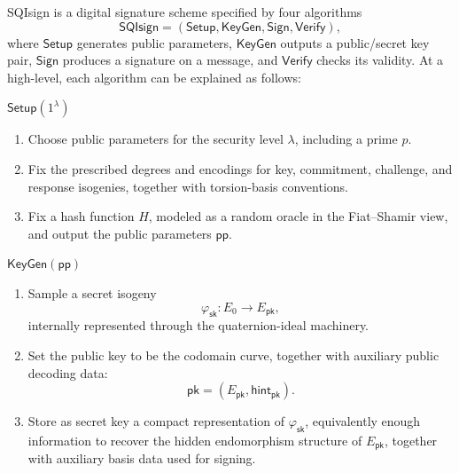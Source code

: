 SQIsign is a digital signature scheme specified by four algorithms
\[
    \mathsf{SQIsign}
    =
    (\mathsf{Setup},\mathsf{KeyGen},\mathsf{Sign},\mathsf{Verify}),
\]
where \(\mathsf{Setup}\) generates public parameters, \(\mathsf{KeyGen}\) outputs a public/secret key pair, \(\mathsf{Sign}\) produces a signature on a message, and \(\mathsf{Verify}\) checks its validity.
At a high-level, each algorithm can be explained as follows:

\begin{algobox}
\underline{\textbf{\(\mathsf{Setup}(1^\lambda)\)}}
\medskip
\begin{enumerate}
  \setlength{\itemsep}{0.15em}
  \item Choose public parameters for the security level \(\lambda\), including
  a prime \(p\).
  \item Fix the prescribed degrees and encodings for key, commitment,
  challenge, and response isogenies, together with torsion-basis conventions.
  \item Fix a hash function \(H\), modeled as a random oracle in the
  Fiat--Shamir view, and output the public parameters \(\mathsf{pp}\).
\end{enumerate}
\end{algobox}

\begin{algobox}
\underline{\textbf{\(\mathsf{KeyGen}(\mathsf{pp})\)}}
\medskip
\begin{enumerate}
  \setlength{\itemsep}{0.15em}
  \item Sample a secret isogeny
  \[
      \varphi_{\mathsf{sk}}:E_0\longrightarrow E_{\mathsf{pk}},
  \]
  internally represented through the quaternion-ideal machinery.
  \item Set the public key to be the codomain curve, together with auxiliary
  public decoding data:
  \[
      \mathsf{pk}=(E_{\mathsf{pk}},\mathsf{hint}_{\mathsf{pk}}).
  \]
  \item Store as secret key a compact representation of
  \(\varphi_{\mathsf{sk}}\), equivalently enough information to recover the
  hidden endomorphism structure of \(E_{\mathsf{pk}}\), together with auxiliary
  basis data used for signing.
\end{enumerate}
\end{algobox}

